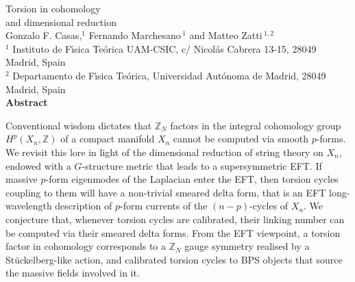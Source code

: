 \documentclass[11pt]{article}
\newcommand{\IZ}{\mathbb{Z}}
\begin{document}
\pagestyle{plain}

\makeatletter
{}
\makeatother
\renewcommand{\theequation}{\thesection.\arabic{equation}}


\pagestyle{empty}
\vspace{0.5cm}
\begin{center}
\Huge{{Torsion in cohomology \\ and dimensional reduction} 
\\[10mm]}
\normalsize{Gonzalo F. Casas,$^{1}$ Fernando Marchesano\,$^{1}$  and Matteo Zatti}\,$^{1,2}$\\[12mm]
\small{
${}^{1}$ Instituto de F\'{\i}sica Te\'orica UAM-CSIC, c/ Nicol\'as Cabrera 13-15, 28049 Madrid, Spain \\[2mm] 
${}^{2}$ Departamento de F\'{\i}sica Te\'orica, Universidad Aut\'onoma de Madrid, 28049 Madrid, Spain
\\[10mm]} 
\small{\bf Abstract} \\[5mm]
\end{center}
\begin{center}
\begin{minipage}[h]{15.0cm} 

Conventional wisdom dictates that $\IZ_N$ factors in the integral cohomology group $H^p(X_n, \IZ)$ of a compact manifold $X_n$ cannot be computed via smooth $p$-forms. We revisit this lore in light of the dimensional reduction of  string theory on $X_n$, endowed with a $G$-structure metric that leads to a supersymmetric EFT. If massive $p$-form eigenmodes of the Laplacian enter the EFT, then torsion cycles coupling to them will have a non-trivial smeared delta form, that is an EFT long-wavelength description of $p$-form currents of the $(n-p)$-cycles of $X_n$. We conjecture that, whenever torsion cycles are calibrated, their linking number can be computed via their smeared delta forms. From the EFT viewpoint, a torsion  factor in cohomology corresponds to a $\IZ_N$ gauge symmetry realised by a St\"uckelberg-like action, and calibrated torsion cycles to BPS objects that source the massive fields involved in it.

\end{minipage}
\end{center}
\newpage
\setcounter{page}{1}
\pagestyle{plain}
\renewcommand{\thefootnote}{\arabic{footnote}}
\setcounter{footnote}{0}
\end{document}
